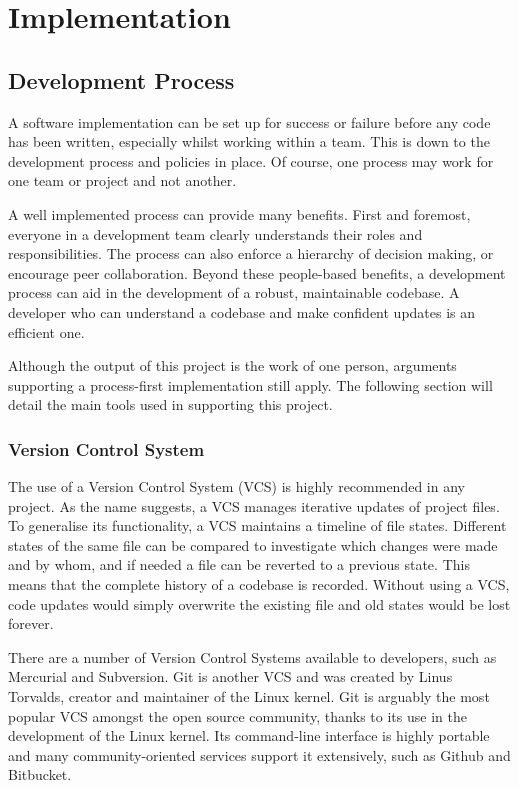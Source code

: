 \chapter{Implementation}

  \section{Development Process}
    A software implementation can be set up for success or failure before any code has been written, especially whilst working within a team. This is down to the development process and policies in place. Of course, one process may work for one team or project and not another.

    A well implemented process can provide many benefits. First and foremost, everyone in a development team clearly understands their roles and responsibilities. The process can also enforce a hierarchy of decision making, or encourage peer collaboration. Beyond these people-based benefits, a development process can aid in the development of a robust, maintainable codebase. A developer who can understand a codebase and make confident updates is an efficient one.

    Although the output of this project is the work of one person, arguments supporting a process-first implementation still apply. The following section will detail the main tools used in supporting this project. 

    \subsection{Version Control System}
      The use of a Version Control System (VCS) is highly recommended in any project. As the name suggests, a VCS manages iterative updates of project files. To generalise its functionality, a VCS maintains a timeline of file states. Different states of the same file can be compared to investigate which changes were made and by whom, and if needed a file can be reverted to a previous state. This means that the complete history of a codebase is recorded. Without using a VCS, code updates would simply overwrite the existing file and old states would be lost forever.

      There are a number of Version Control Systems available to developers, such as Mercurial and Subversion. Git is another VCS and was created by Linus Torvalds, creator and maintainer of the Linux kernel. Git is arguably the most popular VCS amongst the open source community, thanks to its use in the development of the Linux kernel. Its command-line interface is highly portable and many community-oriented services support it extensively, such as Github and Bitbucket.


